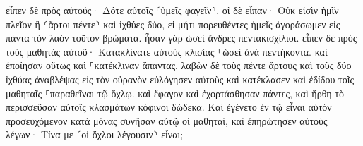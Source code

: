 \documentclass{openreader}
\begin{document}
εἶπεν δὲ πρὸς αὐτούς· Δότε αὐτοῖς ⸂ὑμεῖς φαγεῖν⸃. οἱ δὲ εἶπαν· Οὐκ εἰσὶν ἡμῖν πλεῖον ἢ ⸂ἄρτοι πέντε⸃ καὶ ἰχθύες δύο, εἰ μήτι πορευθέντες ἡμεῖς ἀγοράσωμεν εἰς πάντα τὸν λαὸν τοῦτον βρώματα. 
ἦσαν γὰρ ὡσεὶ ἄνδρες πεντακισχίλιοι. εἶπεν δὲ πρὸς τοὺς μαθητὰς αὐτοῦ· Κατακλίνατε αὐτοὺς κλισίας ⸀ὡσεὶ ἀνὰ πεντήκοντα. 
καὶ ἐποίησαν οὕτως καὶ ⸀κατέκλιναν ἅπαντας. 
λαβὼν δὲ τοὺς πέντε ἄρτους καὶ τοὺς δύο ἰχθύας ἀναβλέψας εἰς τὸν οὐρανὸν εὐλόγησεν αὐτοὺς καὶ κατέκλασεν καὶ ἐδίδου τοῖς μαθηταῖς ⸀παραθεῖναι τῷ ὄχλῳ. 
καὶ ἔφαγον καὶ ἐχορτάσθησαν πάντες, καὶ ἤρθη τὸ περισσεῦσαν αὐτοῖς κλασμάτων κόφινοι δώδεκα. 
Καὶ ἐγένετο ἐν τῷ εἶναι αὐτὸν προσευχόμενον κατὰ μόνας συνῆσαν αὐτῷ οἱ μαθηταί, καὶ ἐπηρώτησεν αὐτοὺς λέγων· Τίνα με ⸂οἱ ὄχλοι λέγουσιν⸃ εἶναι; 
\end{document}
